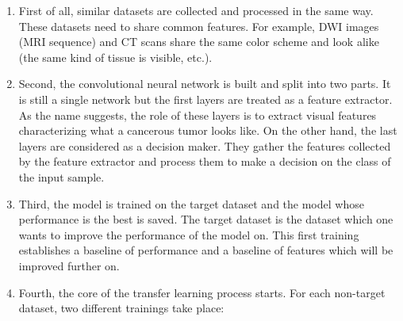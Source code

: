 \begin{enumerate}
\item First of all, similar datasets are collected and processed in the same way. These datasets need to share common features. For example, DWI images (MRI sequence) and CT scans share the same color scheme and look alike (the same kind of tissue is visible, etc.).
\item Second, the convolutional neural network is built and split into two parts. It is still a single network but the first layers are treated as a feature extractor. As the name suggests, the role of these layers is to extract visual features characterizing what a cancerous tumor looks like. On the other hand, the last layers are considered as a decision maker. They gather the features collected by the feature extractor and process them to make a decision on the class of the input sample.
\item Third, the model is trained on the target dataset and the model whose performance is the best is saved. The target dataset is the dataset which one wants to improve the performance of the model on. This first training establishes a baseline of performance and a baseline of features which will be improved further on.
\item Fourth, the core of the transfer learning process starts. For each non-target dataset, two different trainings take place:


\end{enumerate}
